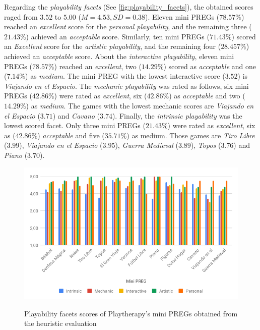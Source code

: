 Regarding the \textit{playability facets} (See \autoref{fig:playability_facets}), the obtained scores raged from $3.52$ to $5.00$ ($M = 4.53, SD = 0.38$). Eleven mini \acp{PREG} ($78.57\%$) reached an \textit{excellent} score for the \textit{personal playability}, and the remaining three ($21.43\%$) achieved an \textit{acceptable} score. Similarly, ten mini \acp{PREG} ($71.43\%$) scored an \textit{Excellent} score for the \textit{artistic playability}, and the remaining four ($28.457\%$) achieved an \textit{acceptable} score. About the \textit{interactive playability}, eleven mini \acp{PREG} ($78.57\%$) reached an \textit{excellent}, two ($14.29\%$) scored as \textit{acceptable} and one ($7.14\%$) as \textit{medium}. The mini \ac{PREG} with the lowest interactive score ($3.52$) is \textit{Viajando en el Espacio}. The \textit{mechanic playability} was rated as follows, six mini \acp{PREG} ($42.86\%$) were rated as \textit{excellent}, six ($42.86\%$) as \textit{acceptable} and two ($14.29\%$) as \textit{medium}. The games with the lowest mechanic scores are \textit{Viajando en el Espacio} ($3.71$) and \textit{Cavano} ($3.74$). Finally, the \textit{intrinsic playability} was the lowest scored facet. Only three mini \acp{PREG} ($21.43\%$) were rated as \textit{excellent}, six as ($42.86\%$) \textit{acceptable} and five ($35.71\%$) as medium. Those games are \textit{Tiro Libre} ($3.99$), \textit{Viajando en el Espacio} ($3.95$), \textit{Guerra Medieval} ($3.89$), \textit{Topos} ($3.76$) and \textit{Piano} ($3.70$).

\begin{figure}[bth]
\myfloatalign
{\includegraphics[width=\linewidth]{gfx/playtherapy/playability_facets}} \quad
\caption{Playability facets scores of Playtherapy's mini \acp{PREG} obtained from the heuristic evaluation}
\label{fig:playability_facets}
\end{figure}

